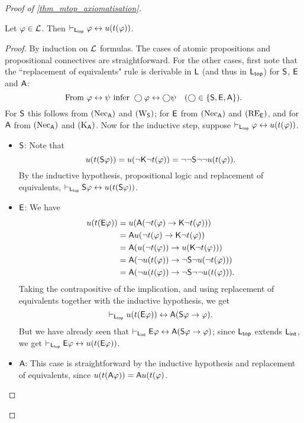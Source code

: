 \begin{proof}[Proof of \cref{thm_mtop_axiomatisation}]
\begin{claim}
\label{claim_ut_equivalence}
Let $\phi \in \cL$. Then $\entails_{\sLtop}
\phi \liff u(t(\phi))$.
\end{claim}

\begin{proof}

By induction on $\cL$ formulas. The cases of atomic
propositions and propositional connectives are straightforward. For
the other cases, first note that the ``replacement of equivalents"
rule is derivable in $\sL$ (and thus in $\sLtop$) for
$\S$, $\E$ and $\A$:
\[
    \text{From } \phi \liff \psi \text{ infer } \bigcirc\phi \liff
    \bigcirc\psi \quad (\bigcirc \in \{\S, \E, \A\}).
\]
For $\S$ this follows from $\necuniv$ and $\weakeningS$; for $\E$ from
$\necuniv$ and $\reE$, and for $\A$ from $\necuniv$ and $\Kuniv$. Now for the
inductive step, suppose $\entails_{\sLtop} \phi \liff u(t(\phi))$.

\begin{itemize}\small
    \item $\S$: Note that
        \[
        u(t(\S\phi))
= u(\neg\K\neg t(\phi))
= \neg\neg\S\neg\neg u(t(\phi)).\]
        By the inductive hypothesis, propositional logic and replacement
of equivalents, $\entails_{\sLtop} \S\phi \liff
u(t(\S\phi))$.

        \item $\E$: We have
        \[
        \begin{aligned}
   u(t(\E\phi))
   &= u(\A(\neg t(\phi) \limplies \K\neg t(\phi))) \\
   &= \A u(\neg t(\phi) \limplies \K\neg t(\phi)) \\
   &= \A (u(\neg t(\phi)) \limplies u(\K\neg t(\phi))) \\
   &= \A (\neg u(t(\phi)) \limplies \neg\S\neg u(\neg t(\phi))) \\
   &= \A (\neg u(t(\phi)) \limplies \neg\S\neg \neg u(t(\phi))).
\end{aligned}\]
        Taking the contrapositive of the implication, and using
replacement of equivalents together with the inductive hypothesis,
we get
        \[
        \entails_{\sLtop} u(t(\E\phi))
    \liff
    \A(
       \S\phi \limplies \phi
    ).\]
        But we have already seen that $\entails_{\sLint} \E\phi
\liff \A(\S\phi \limplies \phi)$; since $\sLtop$ extends
$\sLint$, we get $\entails_{\sLtop} \E\phi \liff
u(t(\E\phi))$.

        \item $\A$: This case is straightforward by the inductive
hypothesis and replacement of equivalents, since
$u(t(\A\phi)) = \A u(t(\phi)$.


\end{itemize}
\end{proof}
\end{proof}
